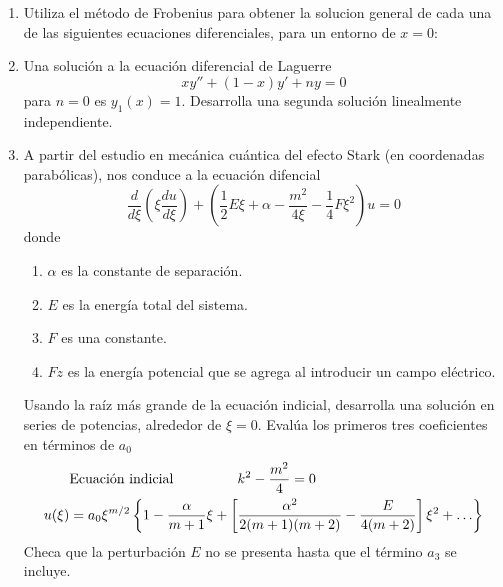 \documentclass[12pt]{article}
\begin{document}
\begin{enumerate}
\begin{enumerate}[label=(\alph*)]
\end{enumerate}
\item Utiliza el método de Frobenius para obtener la solucion general de cada una de las siguientes ecuaciones diferenciales, para un entorno de $x = 0$:
\begin{enumerate}[label=(\alph*)]
\end{enumerate}
\item Una solución a la ecuación diferencial de Laguerre
\[ xy'' + (1-x) y' + ny = 0\]
para $n=0$ es $y_{1}(x)=1$. Desarrolla una segunda solución linealmente independiente.
\item A partir del estudio en mecánica cuántica del efecto Stark (en coordenadas parabólicas), nos conduce a la ecuación difencial
\[ \dfrac{d}{d \xi} \left( \xi \dfrac{d u}{d \xi} \right) + \left( \dfrac{1}{2} E \xi + \alpha - \dfrac{m^{2}}{4 \xi} - \dfrac{1}{4} F \xi^{2} \right) u = 0 \]
donde
\begin{enumerate}[label=(\roman*)]
\item $\alpha$ es la constante de separación.
\item $E$ es la energía total del sistema.
\item $F$ es una constante.
\item $Fz$ es la energía potencial que se agrega al introducir un campo eléctrico.
\end{enumerate}
Usando la raíz más grande de la ecuación indicial, desarrolla una solución en series de potencias, alrededor de $\xi=0$. Evalúa los primeros tres coeficientes en términos de $a_{0}$
\[  \begin{split}
& \text{Ecuación indicial } \hspace{1.5cm} k^{2} - \dfrac{m^{2}}{4} = 0 \\
u(\xi) &=  a_{0} \xi^{m/2} \left\lbrace 1 - \dfrac{\alpha}{m+1} \xi + \left[ \dfrac{\alpha^{2}}{2(m+1)(m+2)} - \dfrac{E}{4(m+2)} \right] \xi^{2} + \ldots \right\rbrace
\end{split} \]
Checa que la perturbación $E$ no se presenta hasta que el término $a_{3}$ se incluye.

\end{enumerate}
\end{document}
